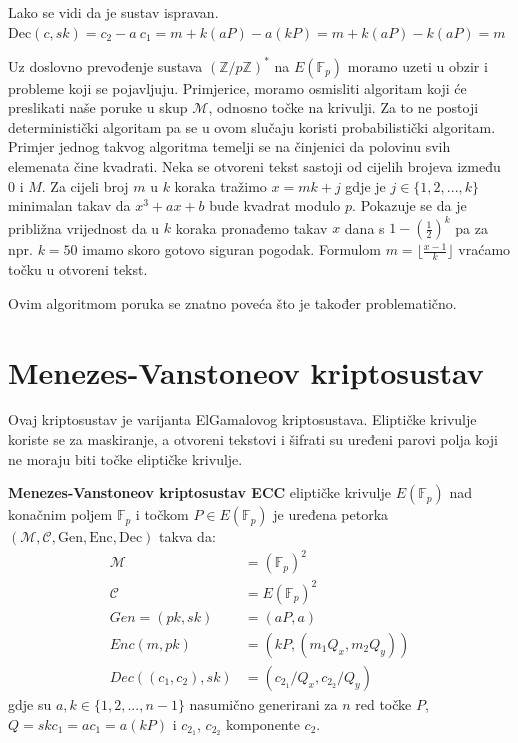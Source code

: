 \documentclass{mathos}
\begin{document}
\begin{nap}
    Lako se vidi da je sustav ispravan. $\text{Dec}(c, sk) = c_2 - a \ c_1 = m + k(aP) - a(kP) = m + k(aP) - k(aP) = m$
\end{nap}

Uz doslovno prevođenje sustava $(\mathbb{Z}/p\mathbb{Z})^*$ na $E(\mathbb{F}_p)$ moramo uzeti u obzir i probleme koji se pojavljuju. Primjerice, moramo osmisliti algoritam koji će preslikati naše poruke u skup $\mathcal{M}$, odnosno točke na krivulji. Za to ne postoji deterministički algoritam pa se u ovom slučaju koristi probabilistički algoritam. Primjer jednog takvog algoritma temelji se na činjenici da polovinu svih elemenata čine kvadrati. Neka se otvoreni tekst sastoji od cijelih brojeva između $0$ i $M$. Za cijeli broj $m$ u $k$ koraka tražimo $x = mk + j$ gdje je $j\in\{1, 2, ..., k\}$ minimalan takav da $x^3 + ax + b$ bude kvadrat modulo $p$. Pokazuje se da je približna vrijednost da u $k$ koraka pronađemo takav $x$ dana s $1 - (\frac{1}{2})^k$ pa za npr. $k = 50$ imamo skoro gotovo siguran pogodak. Formulom $m = \lfloor \frac{x-1}{k} \rfloor$ vraćamo točku u otvoreni tekst.

\begin{nap}
    Ovim algoritmom poruka se znatno poveća što je također problematično.
\end{nap}


\section{Menezes-Vanstoneov kriptosustav}
Ovaj kriptosustav je varijanta ElGamalovog kriptosustava. Eliptičke krivulje koriste se za maskiranje, a otvoreni tekstovi i šifrati su uređeni parovi polja koji ne moraju biti točke eliptičke krivulje.

\begin{defin}
    \textbf{Menezes-Vanstoneov kriptosustav ECC} eliptičke krivulje $E(\mathbb{F}_p)$ nad konačnim poljem $\mathbb{F}_p$ i točkom $P\in E(\mathbb{F}_p)$ je uređena petorka $(\mathcal{M}, \mathcal{C}, \text{Gen}, \text{Enc}, \text{Dec})$ takva da:
    \begin{align*}
        \mathcal{M} & = (\mathbb{F}_p)^2 \\
        \mathcal{C} & = E(\mathbb{F}_p)^2 \\
        Gen = (pk, sk) & = (aP, a) \\
        Enc(m, pk) & = (kP, (m_1 Q_x, m_2 Q_y)) \\
        Dec((c_1, c_2), sk) & = (c_{2_1}/Q_x, c_{2_2}/Q_y)
    \end{align*}
    gdje su $a, k \in \{ 1, 2, ..., n-1 \}$ nasumično generirani za $n$ red točke $P$, $Q = sk c_1 = a c_1 = a(kP)$ i $c_{2_1}$, $c_{2_2}$ komponente $c_2$.
\end{defin}
\end{document}
